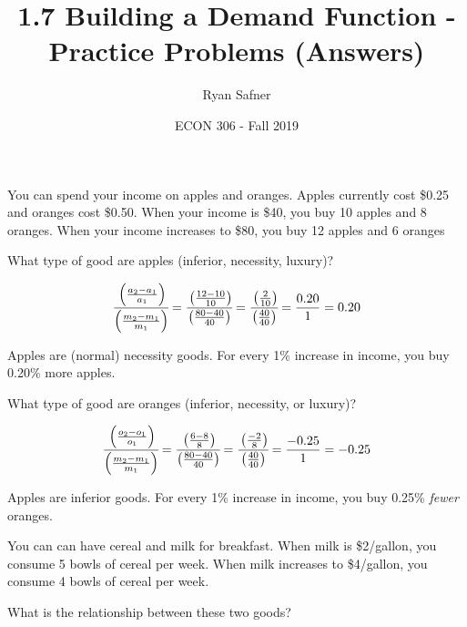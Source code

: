 \documentclass[12 pt]{exam}
\title{1.7 Building a Demand Function - Practice Problems (Answers)}
\author{Ryan Safner}
\date{ECON 306 - Fall 2019}
\begin{document}
\maketitle

You can spend your income on apples and oranges. Apples currently cost \$0.25 and oranges cost \$0.50. When your income is \$40, you buy 10 apples and 8 oranges. When your income increases to \$80, you buy 12 apples and 6 oranges

\begin{questions}

\question What type of good are apples (inferior, necessity, luxury)?

\begin{solution}

\begin{equation*}
\displaystyle \cfrac{\left(\frac{a_2-a_1}{a_1}\right)}{\left(\frac{m_2-m_1}{m_1}\right)} = \cfrac{\left(\frac{12-10}{10}\right)}{\left(\frac{80-40}{40}\right)}=\cfrac{\left(\frac{2}{10}\right)}{\left(\frac{40}{40}\right)} = \frac{0.20}{1} = 0.20
\end{equation*}

Apples are (normal) necessity goods. For every 1\% increase in income, you buy 0.20\% more apples.

\end{solution}

\question What type of good are oranges (inferior, necessity, or luxury)?

\begin{solution}

\begin{equation*}
\displaystyle \cfrac{\left(\frac{o_2-o_1}{o_1}\right)}{\left(\frac{m_2-m_1}{m_1}\right)} = \cfrac{\left(\frac{6-8}{8}\right)}{\left(\frac{80-40}{40}\right)}=\cfrac{\left(\frac{-2}{8}\right)}{\left(\frac{40}{40}\right)} = \frac{-0.25}{1} = -0.25
\end{equation*}

Apples are inferior goods. For every 1\% increase in income, you buy 0.25\% \emph{fewer} oranges.

\end{solution}

\clearpage

You can can have cereal and milk for breakfast. When milk is \$2/gallon, you consume 5 bowls of cereal per week. When milk increases to \$4/gallon, you consume 4 bowls of cereal per week.

\question What is the relationship between these two goods?


\end{questions}
\end{document}
